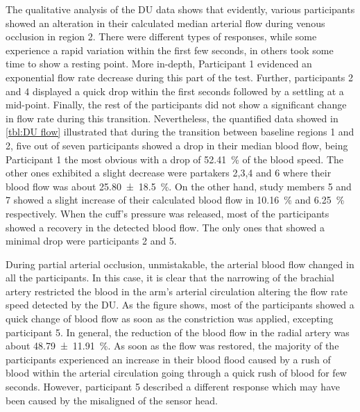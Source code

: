The qualitative analysis of the DU data shows that evidently, various participants showed an alteration in their calculated median arterial flow during venous occlusion in region 2. There were different types of responses, while some experience a rapid variation within the first few seconds, in others took some time to show a resting point. More in-depth, Participant 1 evidenced an exponential flow rate decrease during this part of the test. Further, participants 2 and 4 displayed a quick drop within the first seconds followed by a settling at a mid-point. Finally, the rest of the participants did not show a significant change in flow rate during this transition. Nevertheless, the quantified data showed in \ref{tbl:DU flow} illustrated that during the transition between baseline regions 1 and 2, five out of seven participants showed a drop in their median blood flow, being Participant 1 the most obvious with a drop of \SI{52.41}{\percent} of the blood speed. The other ones exhibited a slight decrease were partakers 2,3,4 and 6 where their blood flow was about \SI{25.80(1850)}{\percent}. On the other hand, study members 5 and 7 showed a slight increase of their calculated blood flow in \SI{10.16}{\percent} and \SI{6.25}{\percent} respectively. When the cuff's pressure was released, most of the participants showed a recovery in the detected blood flow. The only ones that showed a minimal drop were participants 2 and 5.

During partial arterial occlusion, unmistakable, the arterial blood flow changed in all the participants. In this case, it is clear that the narrowing of the brachial artery restricted the blood in the arm's arterial circulation altering the flow rate speed detected by the DU. As the figure shows, most of the participants showed a quick change of blood flow as soon as the constriction was applied, excepting participant 5. In general, the reduction of the blood flow in the radial artery was about \SI{48.79(1191)}{\percent}. As soon as the flow was restored, the majority of the participants experienced an increase in their blood flood caused by a rush of blood within the arterial circulation going through a quick rush of blood for few seconds. However, participant 5 described a different response which may have been caused by the misaligned of the sensor head.  

